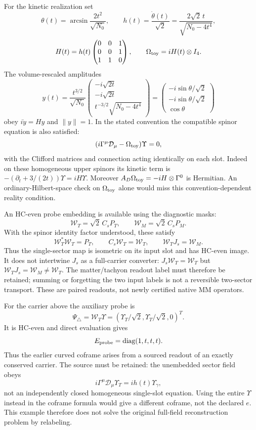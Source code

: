 \documentclass[11pt,a4paper]{article}
\begin{document}
For the kinetic realization set
\[
 \theta(t)=\arcsin\frac{2t^2}{\sqrt{N_0}},\qquad
 h(t)=\frac{\dot\theta(t)}{\sqrt2}
 =\frac{2\sqrt2\,t}{\sqrt{N_0-4t^4}},
\]
\[
 H(t)=h(t)\begin{pmatrix}0&0&1\\0&0&1\\1&1&0\end{pmatrix},
 \qquad \Omega_{\rm toy}=iH(t)\otimes I_4.
\]
The volume-rescaled amplitudes
\[
 y(t)=\frac{t^{3/2}}{\sqrt{N_0}}
 \begin{pmatrix}-i\sqrt{2t}\\-i\sqrt{2t}\\
 t^{-3/2}\sqrt{N_0-4t^4}\end{pmatrix}
 =\begin{pmatrix}-i\sin\theta/\sqrt2\\
 -i\sin\theta/\sqrt2\\\cos\theta\end{pmatrix}
\]
obey $i\dot y=Hy$ and $\|y\|=1$. In the stated convention the
compatible spinor equation is also satisfied:
\[
 (i\Gamma^\mu\mathcal D_\mu-\Omega_{\rm toy})\Upsilon=0,
\]
with the Clifford matrices and connection acting identically on each
slot. Indeed on these homogeneous upper spinors its kinetic term is
$-(\partial_t+3/(2t))\Upsilon=iH\Upsilon$.
Moreover $A_D\Omega_{\rm toy}=-iH\otimes\Gamma^0$ is Hermitian.
An ordinary-Hilbert-space check on $\Omega_{\rm toy}$ alone would
miss this convention-dependent reality condition.

An HC-even probe embedding is available using the diagnostic masks:
\[
 \mathcal W_T=\sqrt2\,C_sP_T,\qquad
 \mathcal W_M=\sqrt2\,C_sP_M.
\]
With the spinor identity factor understood, these satisfy
\[
 \mathcal W_T^*\mathcal W_T=P_T,\qquad
 C_s\mathcal W_T=\mathcal W_T,\qquad
 \mathcal W_TJ_s=\mathcal W_M.
\]
Thus the single-sector map is isometric on its input slot and has
HC-even image. It does not intertwine $J_s$ as a full-carrier converter:
$J_s\mathcal W_T=\mathcal W_T$ but
$\mathcal W_TJ_s=\mathcal W_M\ne\mathcal W_T$.
The matter/tachyon readout label must therefore be retained; summing or
forgetting the two input labels is not a reversible two-sector transport.
These are paired readouts, not newly certified native MM operators.

For the carrier above the auxiliary probe is
\[
 \Psi_\triangle=\mathcal W_T\Upsilon
 =(\Upsilon_T/\sqrt2,\Upsilon_T/\sqrt2,0)^T.
\]
It is HC-even and direct evaluation gives
\[
 E_{\rm probe}=\operatorname{diag}(1,t,t,t).
\]
Thus the earlier curved coframe arises from a sourced readout of an
exactly conserved carrier. The source must be retained: the unembedded
sector field obeys
\[
 i\Gamma^\mu\mathcal D_\mu\Upsilon_T
 =ih(t)\Upsilon_\gamma,
\]
not an independently closed homogeneous single-slot equation. Using
the entire $\Upsilon$ instead in the coframe formula would give a
different coframe, not the declared $e$. This example therefore does
not solve the original full-field reconstruction problem by relabeling.
\end{document}
